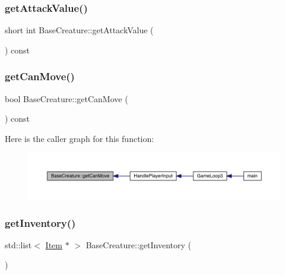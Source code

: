 \subsubsection{\texorpdfstring{get\+Attack\+Value()}{getAttackValue()}}
{\footnotesize\ttfamily short int Base\+Creature\+::get\+Attack\+Value (\begin{DoxyParamCaption}{ }\end{DoxyParamCaption}) const}

\mbox{\label{class_base_creature_a21c84d48b1395f0305fb0ab5ca760db3}} 
\subsubsection{\texorpdfstring{get\+Can\+Move()}{getCanMove()}}
{\footnotesize\ttfamily bool Base\+Creature\+::get\+Can\+Move (\begin{DoxyParamCaption}{ }\end{DoxyParamCaption}) const}

Here is the caller graph for this function\+:
\nopagebreak
\begin{figure}[H]
\begin{center}
\leavevmode
\includegraphics[width=350pt]{d2/d3b/class_base_creature_a21c84d48b1395f0305fb0ab5ca760db3_icgraph}
\end{center}
\end{figure}
\mbox{\label{class_base_creature_a505e70415a3e2db87aac0767498375ff}} 
\subsubsection{\texorpdfstring{get\+Inventory()}{getInventory()}}
{\footnotesize\ttfamily std\+::list$<$ \mbox{\hyperlink{class_item}{Item}} $\ast$ $>$ Base\+Creature\+::get\+Inventory (\begin{DoxyParamCaption}{ }\end{DoxyParamCaption})}

